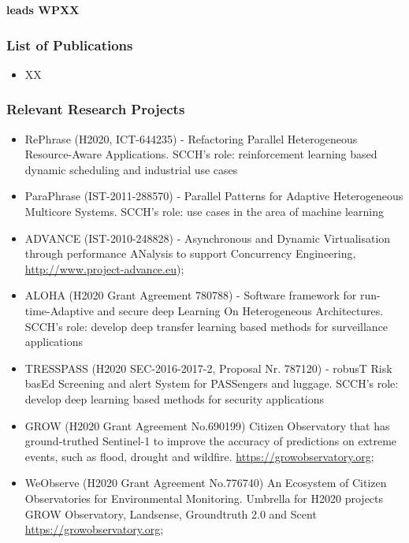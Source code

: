 \documentclass[a4paper,11pt]{article}
\begin{document}
\vspace{10pt}
\textbf{\SCCHshort{} leads WPXX}
\vspace{10pt}

\subsubsection*{List of Publications}

\begin{itemize}

\item XX
  
\end{itemize}

\subsubsection*{Relevant Research Projects}

\begin{itemize}

\item RePhrase (H2020, ICT-644235) - Refactoring Parallel Heterogeneous Resource-Aware Applications. SCCH's role: reinforcement learning based dynamic scheduling and industrial use cases

\item ParaPhrase (IST-2011-288570) - Parallel Patterns for Adaptive Heterogeneous Multicore Systems. SCCH's role: use cases in the area of machine learning

\item ADVANCE (IST-2010-248828) - Asynchronous and Dynamic Virtualisation through performance ANalysis to support Concurrency Engineering, \url{http://www.project-advance.eu});

\item ALOHA (H2020 Grant Agreement 780788) - Software framework for run-time-Adaptive and secure deep Learning On Heterogeneous Architectures. SCCH's role: develop deep transfer learning based methods for surveillance applications

\item TRESSPASS (H2020 SEC-2016-2017-2, Proposal Nr. 787120) - robusT Risk basEd Screening and alert System for PASSengers and luggage. SCCH's role: develop deep learning based methods for security applications

\item GROW (H2020 Grant Agreement No.690199) Citizen Observatory that has ground-truthed Sentinel-1 to improve the accuracy of predictions on extreme events, such as flood, drought and wildfire. \url{https://growobservatory.org};

\item WeObserve (H2020 Grant Agreement No.776740) An Ecosystem of Citizen Observatories for Environmental Monitoring. Umbrella for H2020 projects GROW Observatory, Landsense, Groundtruth 2.0 and Scent \url{https://growobservatory.org};

\end{itemize}
\end{document}
